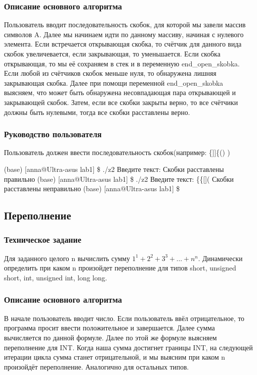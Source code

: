 \documentclass[a4paper,12pt]{extarticle}
\begin{document}
\subsubsection{Описание основного алгоритма}
Пользователь вводит последовательность скобок, для которой мы завели массив символов A. Далее мы начинаем идти по данному массиву, начиная с нулевого элемента. Если встречается открывающая скобка, то счётчик для данного вида скобок увеличевается, если закрывающая, то уменьшается. Если скобка открывающая, то мы её сохраняем в стек и в переменную end\_open\_skobka. Если любой из счётчиков скобок меньше нуля, то обнаружена лишняя закрывающая скобка. Далее при помощи переменной end\_open\_skobka выясняем, что может быть обнаружена несовпадающая пара открывающей и закрывающей скобок. Затем, если все скобки закрыты верно, то все счётчики должны быть нулевыми, тогда все скобки расставлены верно.

\subsubsection{Руководство пользователя}
Пользователь должен ввести последовательность скобок(например: \{]]\{() )

(base) [anna@Ultra-asus lab1]  \$ ./z2\newline
Введите текст: \newline
[\{()\}]\newline
Скобки расставлены правильно\newline
(base) [anna@Ultra-asus lab1] \$ ./z2\newline
Введите текст: \newline
\{\{[]( \newline
Скобки расставлены неправильно\newline
(base) [anna@Ultra-asus lab1] \$\newline

\subsection{Переполнение}
\subsubsection{Техническое задание}
Для  заданного  целого n вычислить  сумму $1^1+2^2+3^3+...+n^n$.  Динамически определить при каком n произойдет переполнение для типов short, unsigned short, int, unsigned int, long long.

\subsubsection{Описание основного алгоритма}
В начале пользователь вводит число. Если пользователь ввёл отрицательное, то программа просит ввести положительное и завершается. Далее сумма вычисляется по данной формуле. Далее по этой же формуле выясняем переполнение для INT. Когда наша сумма достигнет границы INT, на следующей итерации цикла сумма станет отрицательной, и мы выясним при каком n произойдёт переполнение. Аналогично для остальных типов.
\end{document}
